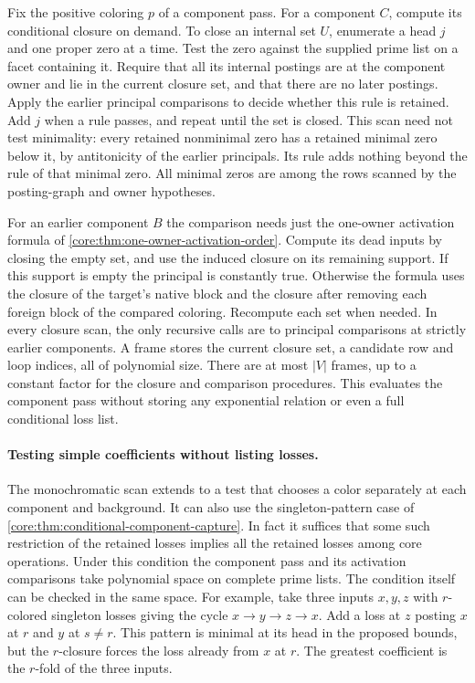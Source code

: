 Fix the positive coloring $p$ of a component pass. For a
component $C$, compute its conditional closure on demand.
To close an internal set $U$, enumerate a head $j$ and one
proper zero at a time. Test the zero against the supplied
prime list on a facet containing it. Require that all its
internal postings are at the component owner and lie in the
current closure set, and that there are no later postings.
Apply the earlier principal comparisons to decide whether
this rule is retained. Add $j$ when a rule passes, and repeat
until the set is closed. This scan need not test minimality:
every retained nonminimal zero has a retained minimal zero
below it, by antitonicity of the earlier principals. Its rule
adds nothing beyond the rule of that minimal zero. All
minimal zeros are among the rows scanned by the posting-graph
and owner hypotheses.

For an earlier component $B$ the comparison needs just the
one-owner activation formula of
\cref{core:thm:one-owner-activation-order}. Compute its
dead inputs by closing the empty set, and use the induced
closure on its remaining support. If this support is empty
the principal is constantly true. Otherwise the formula
uses the closure of the target's native block and the
closure after removing each foreign block of the compared
coloring. Recompute each set when needed. In every closure
scan, the only recursive calls are to principal comparisons
at strictly earlier components. A frame stores the current
closure set, a candidate row and loop indices, all of
polynomial size. There are at most $|V|$ frames, up to a
constant factor for the closure and comparison procedures.
This evaluates the component pass without storing any
exponential relation or even a full conditional loss list.

\paragraph{Testing simple coefficients without listing losses.}
The monochromatic scan extends to a test that chooses a color
separately at each component and background. It can also use
the singleton-pattern case of
\cref{core:thm:conditional-component-capture}. In fact it
suffices that some such restriction of the retained losses
implies all the retained losses among core operations.
Under this condition the component pass and its activation
comparisons take polynomial space on complete prime lists.
The condition itself can be checked in the same space.
For example, take three inputs $x,y,z$ with $r$-colored
singleton losses giving the cycle $x\to y\to z\to x$.
Add a loss at $z$ posting $x$ at $r$ and $y$ at $s\ne r$.
This pattern is minimal at its head in the proposed bounds,
but the $r$-closure forces the loss already from $x$ at $r$.
The greatest coefficient is the $r$-fold of the three inputs.

